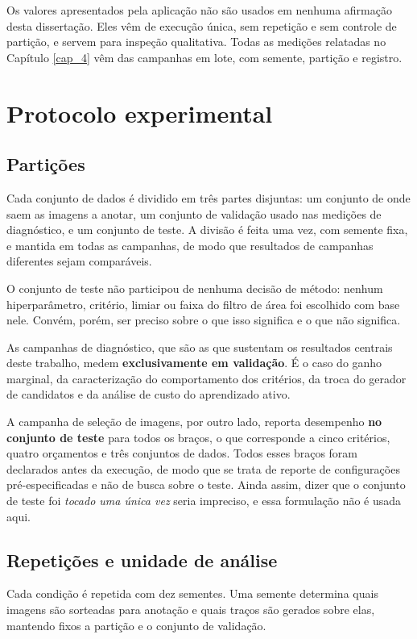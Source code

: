 Os valores apresentados pela aplicação não são usados em nenhuma afirmação desta dissertação. Eles vêm de execução única, sem repetição e sem controle de partição, e servem para inspeção qualitativa. Todas as medições relatadas no Capítulo \ref{cap_4} vêm das campanhas em lote, com semente, partição e registro.

\section{Protocolo experimental}

\subsection{Partições}

Cada conjunto de dados é dividido em três partes disjuntas: um conjunto de onde saem as imagens a anotar, um conjunto de validação usado nas medições de diagnóstico, e um conjunto de teste. A divisão é feita uma vez, com semente fixa, e mantida em todas as campanhas, de modo que resultados de campanhas diferentes sejam comparáveis.

O conjunto de teste não participou de nenhuma decisão de método: nenhum hiperparâmetro, critério, limiar ou faixa do filtro de área foi escolhido com base nele. Convém, porém, ser preciso sobre o que isso significa e o que não significa.

As campanhas de diagnóstico, que são as que sustentam os resultados centrais deste trabalho, medem \textbf{exclusivamente em validação}. É o caso do ganho marginal, da caracterização do comportamento dos critérios, da troca do gerador de candidatos e da análise de custo do aprendizado ativo.

A campanha de seleção de imagens, por outro lado, reporta desempenho \textbf{no conjunto de teste} para todos os braços, o que corresponde a cinco critérios, quatro orçamentos e três conjuntos de dados. Todos esses braços foram declarados antes da execução, de modo que se trata de reporte de configurações pré-especificadas e não de busca sobre o teste. Ainda assim, dizer que o conjunto de teste foi \emph{tocado uma única vez} seria impreciso, e essa formulação não é usada aqui.

\subsection{Repetições e unidade de análise}

Cada condição é repetida com dez sementes. Uma semente determina quais imagens são sorteadas para anotação e quais traços são gerados sobre elas, mantendo fixos a partição e o conjunto de validação.


